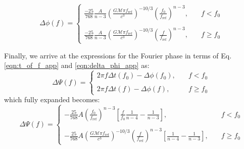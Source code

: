 \begin{equation}\label{eqn:delta_phi_app}
\Delta \phi(f) = \left \{
                     \begin{array}{ll}
                     \frac{-25}{768} \frac{A}{n-3} \left ( \frac{G \mathcal{M} \pi f_{\mathrm{ref}}}{c^3} \right )^{-10/3} \left ( \frac{f_0}{f_{\mathrm{ref}}} \right )^{n-3}, &\quad  f < f_0 \\ \\
                     \frac{-25}{768} \frac{A}{n-3} \left ( \frac{G \mathcal{M} \pi f_{\mathrm{ref}}}{c^3} \right )^{-10/3} \left ( \frac{f}{f_{\mathrm{ref}}} \right )^{n-3}, &\quad  f \ge f_0
                     \end{array}
                     \right.
\end{equation}

Finally, we arrive at the expressions for the Fourier phase in terms of Eq. \ref{eqn:t_of_f_app} and \ref{eqn:delta_phi_app} as:
\begin{equation}\label{eqn:fourier_phase_app}
\Delta \Psi(f) = \left \{
                     \begin{array}{ll}
                      2 \pi f \Delta t(f_0) - \Delta \phi(f_0), &\quad  f < f_0 \\ \\
                      2 \pi f \Delta t(f) - \Delta \phi(f), &\quad f \ge f_0
                     \end{array}
                     \right.
\end{equation}
which fully expanded becomes:
\begin{equation}\label{eqn:fourier_phase_final_app}
\Delta \Psi(f) = \left \{
                     \begin{array}{ll}
                      - \frac{25}{768} A \left ( \frac{f_0}{f_{\mathrm{ref}}} \right)^{n-3} \left [ \frac{f}{f_0}\frac{1}{n-4} - \frac{1}{n-3} \right], &\quad  f < f_0 \\ \\
                      - \frac{25}{768} A \left (\frac{G \mathcal{M} \pi f_{\mathrm{ref}}}{c^3} \right )^{-10/3} \left ( \frac{f}{f_{\mathrm{ref}}} \right )^{n-3} \left [\frac{1}{n-4} - \frac{1}{n-3} \right ],  &\quad  f \ge f_0
                      \end{array}
                 \right.
\end{equation}

